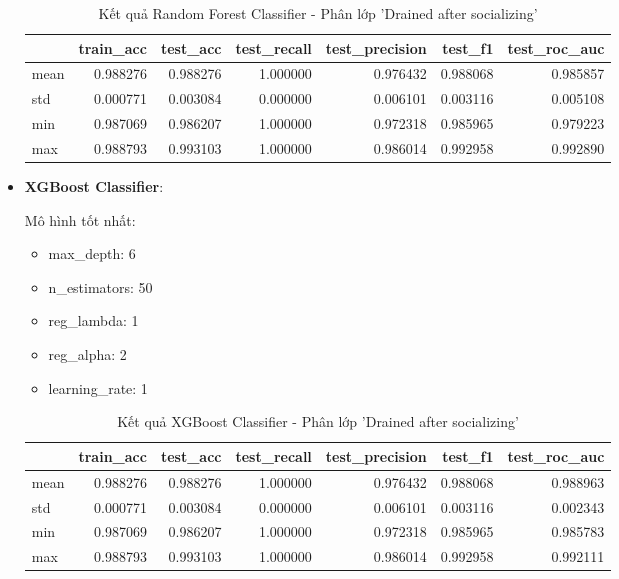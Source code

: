 \begin{itemize}
            \begin{table}[htbp]
                \centering
                \caption{Kết quả Random Forest Classifier - Phân lớp 'Drained after socializing'}
                \label{tab:Behavior-drain-RF}
                \begin{tabular}{lrrrrrr}
                    \hline
                     & train\_acc & test\_acc & test\_recall & test\_precision & test\_f1 & test\_roc\_auc \\
                    \hline
                    mean & 0.988276 & 0.988276 & 1.000000 & 0.976432 & 0.988068 & 0.985857 \\
                    std & 0.000771 & 0.003084 & 0.000000 & 0.006101 & 0.003116 & 0.005108 \\
                    min & 0.987069 & 0.986207 & 1.000000 & 0.972318 & 0.985965 & 0.979223 \\
                    max & 0.988793 & 0.993103 & 1.000000 & 0.986014 & 0.992958 & 0.992890 \\
                    \hline
                \end{tabular}
            \end{table}
            
            \FloatBarrier

        \item \textbf{XGBoost Classifier}:
        
            Mô hình tốt nhất:
            \begin{itemize}
                \item max\_depth: 6
                \item n\_estimators: 50
                \item reg\_lambda: 1
                \item reg\_alpha: 2
                \item learning\_rate: 1
            \end{itemize}

            \begin{table}[htbp]
                \centering
                \caption{Kết quả XGBoost Classifier - Phân lớp 'Drained after socializing'}
                \label{tab:Behavior-drain-XGBC}
                \begin{tabular}{lrrrrrr}
                \hline
                 & train\_acc & test\_acc & test\_recall & test\_precision & test\_f1 & test\_roc\_auc \\
                \hline
                mean & 0.988276 & 0.988276 & 1.000000 & 0.976432 & 0.988068 & 0.988963 \\
                std & 0.000771 & 0.003084 & 0.000000 & 0.006101 & 0.003116 & 0.002343 \\
                min & 0.987069 & 0.986207 & 1.000000 & 0.972318 & 0.985965 & 0.985783 \\
                max & 0.988793 & 0.993103 & 1.000000 & 0.986014 & 0.992958 & 0.992111 \\
                \hline
                \end{tabular}
            \end{table}


\end{itemize}
